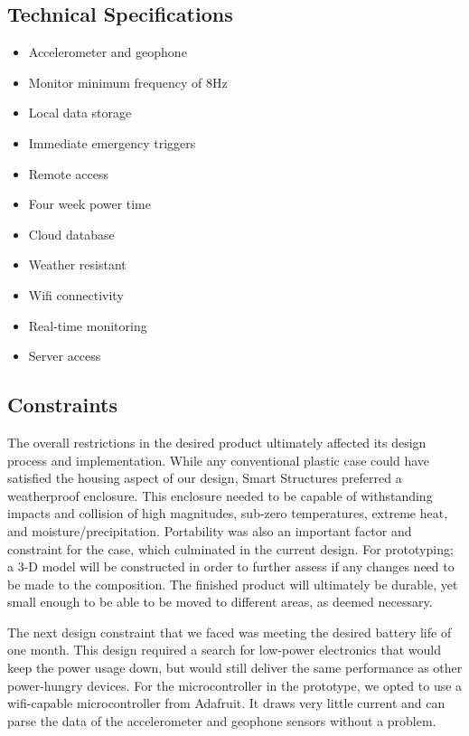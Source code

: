\documentclass[12pt]{article}
\begin{document}
\subsection{Technical Specifications}
\begin{itemize}
	\item Accelerometer and geophone
	\item Monitor minimum frequency of 8Hz
	\item Local data storage
	\item Immediate emergency triggers
	\item Remote access
	\item Four week power time
	\item Cloud database
	\item Weather resistant
	\item Wifi connectivity
	\item Real-time monitoring 
	\item Server access
\end{itemize}

\subsection{Constraints}
The overall restrictions in the desired product ultimately affected its design process and implementation. While any conventional plastic case could have satisfied the housing aspect of our design, Smart Structures preferred a weatherproof enclosure. This enclosure needed to be capable of withstanding impacts and collision of high magnitudes, sub-zero temperatures, extreme heat, and moisture/precipitation. Portability was also an important factor and constraint for the case, which culminated in the current design. For prototyping; a 3-D model will be constructed in order to further assess if any changes need to be made to the composition. The finished product will ultimately be durable, yet small enough to be able to be moved to different areas, as deemed necessary.

The next design constraint that we faced was meeting the desired battery life of one month. This design required a search for low-power electronics that would keep the power usage down, but would still deliver the same performance as other power-hungry devices. For the microcontroller in the prototype, we opted to use a wifi-capable microcontroller from Adafruit. It draws very little current and can parse the data of the accelerometer and geophone sensors without a problem.
\end{document}
